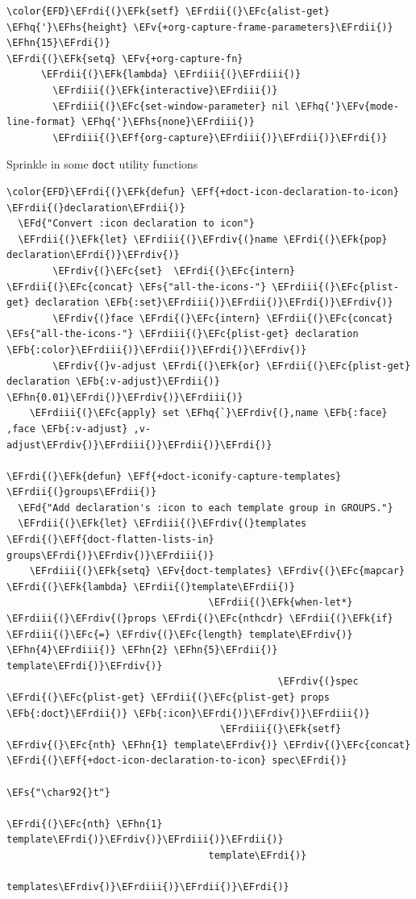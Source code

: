 \documentclass{scrartcl}
\newcommand{\EFk}[1]{\textcolor{EFk}{#1}} %
\newcommand{\EFd}[1]{\textcolor{EFd}{#1}} %
\newcommand{\EFs}[1]{\textcolor{EFs}{#1}} %
\newcommand{\EFb}[1]{\textcolor{EFb}{#1}} %
\newcommand{\EFc}[1]{\textcolor{EFc}{#1}} %
\newcommand{\EFv}[1]{\textcolor{EFv}{#1}} %
\newcommand{\EFf}[1]{\textcolor{EFf}{#1}} %
\newcommand{\EFhn}[1]{#1} %
\newcommand{\EFhq}[1]{#1} %
\newcommand{\EFhs}[1]{#1} %
\newcommand{\EFrdi}[1]{#1} %
\newcommand{\EFrdii}[1]{#1} %
\newcommand{\EFrdiii}[1]{#1} %
\newcommand{\EFrdiv}[1]{#1} %
\begin{document}
\begin{Code}
\begin{Verbatim}[]
\color{EFD}\EFrdi{(}\EFk{setf} \EFrdii{(}\EFc{alist-get} \EFhq{'}\EFhs{height} \EFv{+org-capture-frame-parameters}\EFrdii{)} \EFhn{15}\EFrdi{)}
\EFrdi{(}\EFk{setq} \EFv{+org-capture-fn}
      \EFrdii{(}\EFk{lambda} \EFrdiii{(}\EFrdiii{)}
        \EFrdiii{(}\EFk{interactive}\EFrdiii{)}
        \EFrdiii{(}\EFc{set-window-parameter} nil \EFhq{'}\EFv{mode-line-format} \EFhq{'}\EFhs{none}\EFrdiii{)}
        \EFrdiii{(}\EFf{org-capture}\EFrdiii{)}\EFrdii{)}\EFrdi{)}
\end{Verbatim}
\end{Code}

Sprinkle in some \texttt{doct} utility functions
\begin{Code}
\begin{Verbatim}[]
\color{EFD}\EFrdi{(}\EFk{defun} \EFf{+doct-icon-declaration-to-icon} \EFrdii{(}declaration\EFrdii{)}
  \EFd{"Convert :icon declaration to icon"}
  \EFrdii{(}\EFk{let} \EFrdiii{(}\EFrdiv{(}name \EFrdi{(}\EFk{pop} declaration\EFrdi{)}\EFrdiv{)}
        \EFrdiv{(}\EFc{set}  \EFrdi{(}\EFc{intern} \EFrdii{(}\EFc{concat} \EFs{"all-the-icons-"} \EFrdiii{(}\EFc{plist-get} declaration \EFb{:set}\EFrdiii{)}\EFrdii{)}\EFrdi{)}\EFrdiv{)}
        \EFrdiv{(}face \EFrdi{(}\EFc{intern} \EFrdii{(}\EFc{concat} \EFs{"all-the-icons-"} \EFrdiii{(}\EFc{plist-get} declaration \EFb{:color}\EFrdiii{)}\EFrdii{)}\EFrdi{)}\EFrdiv{)}
        \EFrdiv{(}v-adjust \EFrdi{(}\EFk{or} \EFrdii{(}\EFc{plist-get} declaration \EFb{:v-adjust}\EFrdii{)} \EFhn{0.01}\EFrdi{)}\EFrdiv{)}\EFrdiii{)}
    \EFrdiii{(}\EFc{apply} set \EFhq{`}\EFrdiv{(},name \EFb{:face} ,face \EFb{:v-adjust} ,v-adjust\EFrdiv{)}\EFrdiii{)}\EFrdii{)}\EFrdi{)}

\EFrdi{(}\EFk{defun} \EFf{+doct-iconify-capture-templates} \EFrdii{(}groups\EFrdii{)}
  \EFd{"Add declaration's :icon to each template group in GROUPS."}
  \EFrdii{(}\EFk{let} \EFrdiii{(}\EFrdiv{(}templates \EFrdi{(}\EFf{doct-flatten-lists-in} groups\EFrdi{)}\EFrdiv{)}\EFrdiii{)}
    \EFrdiii{(}\EFk{setq} \EFv{doct-templates} \EFrdiv{(}\EFc{mapcar} \EFrdi{(}\EFk{lambda} \EFrdii{(}template\EFrdii{)}
                                   \EFrdii{(}\EFk{when-let*} \EFrdiii{(}\EFrdiv{(}props \EFrdi{(}\EFc{nthcdr} \EFrdii{(}\EFk{if} \EFrdiii{(}\EFc{=} \EFrdiv{(}\EFc{length} template\EFrdiv{)} \EFhn{4}\EFrdiii{)} \EFhn{2} \EFhn{5}\EFrdii{)} template\EFrdi{)}\EFrdiv{)}
                                               \EFrdiv{(}spec \EFrdi{(}\EFc{plist-get} \EFrdii{(}\EFc{plist-get} props \EFb{:doct}\EFrdii{)} \EFb{:icon}\EFrdi{)}\EFrdiv{)}\EFrdiii{)}
                                     \EFrdiii{(}\EFk{setf} \EFrdiv{(}\EFc{nth} \EFhn{1} template\EFrdiv{)} \EFrdiv{(}\EFc{concat} \EFrdi{(}\EFf{+doct-icon-declaration-to-icon} spec\EFrdi{)}
                                                                    \EFs{"\char92{}t"}
                                                                    \EFrdi{(}\EFc{nth} \EFhn{1} template\EFrdi{)}\EFrdiv{)}\EFrdiii{)}\EFrdii{)}
                                   template\EFrdi{)}
                                 templates\EFrdiv{)}\EFrdiii{)}\EFrdii{)}\EFrdi{)}


\end{Verbatim}
\end{Code}
\end{document}
